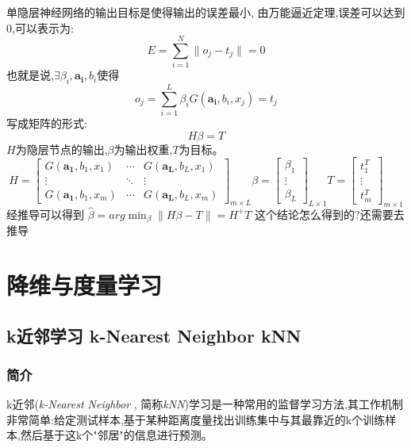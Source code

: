 \documentclass[UTF8,a4paper]{ctexart}%
\begin{document}
          单隐层神经网络的输出目标是使得输出的误差最小,
          由万能逼近定理,误差可以达到0,可以表示为:
          \begin{equation}
            E = \sum_{i = 1}^N \| o_j - t_j\| = 0
          \end{equation}
          也就是说,$\exists \beta_i,\boldsymbol{a_i},b_i$使得
          \begin{equation}
            o_j = \sum_{i = 1}^L \beta_iG(\boldsymbol{a_i},b_i,x_j) = t_j
          \end{equation}
          写成矩阵的形式:
          \begin{equation}
            H\beta = T
          \end{equation}
          $H$为隐层节点的输出,$\beta$为输出权重,$T$为目标。
          \begin{equation}
            H =
            \begin{bmatrix}
              G(\boldsymbol{a_1},b_1,x_1) & \cdots & G(\boldsymbol{a_L},b_L,x_1) \\
              \vdots & \ddots & \vdots \\
              G(\boldsymbol{a_1},b_1,x_m) & \cdots & G(\boldsymbol{a_L},b_L,x_m)
            \end{bmatrix}_{m \times L}
            \beta =
            \begin{bmatrix}
              \beta_1\\\vdots\\\beta_L
            \end{bmatrix}_{L\times 1}
            T = \begin{bmatrix}
              t_1^T\\\vdots\\t_m^T
            \end{bmatrix}_{m\times 1}
          \end{equation}
          经推导可以得到 $\hat{\beta} = arg \min_\beta \|H\beta - T\| = H^+T$ {\color{red}这个结论怎么得到的?还需要去推导}

  \section{降维与度量学习}
      \subsection{k近邻学习 k-Nearest Neighbor kNN}
          \subsubsection{简介}
              k近邻(\emph{k-Nearest Neighbor} , 简称\emph{kNN})学习是一种常用的监督学习方法,其工作机制非常简单:给定测试样本,基于某种距离度量找出训练集中与其最靠近的k个训练样本,然后基于这k个"邻居"的信息进行预测。
\end{document}
